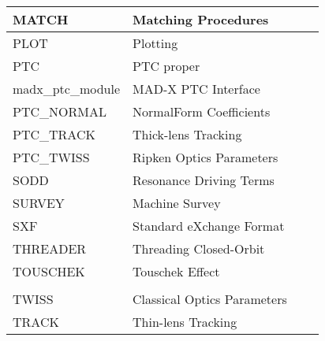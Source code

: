 \begin{table}[H]
\begin{tabular}{l|l|l|l}
MATCH              &Matching Procedures         &{\color{green}{O.~Br\"uning}}                   & {\color{red}{Oliver.Bruning@cern.ch}}      \\\hline
PLOT               &Plotting                    &{\color{green}{R.~de~Maria}}                    & {\color{red}{Riccardo.de.Maria@cern.ch}}   \\\hline
PTC                &PTC proper                  &{\color{red}{E.~Forest}} {\color{blue}{KEK}}    & {\color{red}{eforest\_4816968@hotmail.com}}\\\hline
madx\_ptc\_module    &MAD-X PTC Interface         &{\color{green}{F.~Schmidt}}                      & {\color{red}{Frank.Schmidt@cern.ch}}       \\\hline
PTC\_NORMAL        &NormalForm Coefficients     &{\color{green}{tba}}                            & {\color{red}{}}                  	      \\\hline
PTC\_TRACK         &Thick-lens Tracking         &{\color{red}{V.~Kapin}}{\color{blue}{ITEP (RU)}}& {\color{red}{Valery.Kapin@cern.ch}}        \\\hline
PTC\_TWISS         &Ripken Optics Parameters    &{\color{green}{tba}}                            & {\color{red}{}}                            \\\hline
SODD               &Resonance Driving Terms     &{\color{green}{F.~Schmidt}}                     & {\color{red}{Frank.Schmidt@cern.ch}}       \\\hline
SURVEY             &Machine Survey              &{\color{green}{F.~Tecker}}                      & {\color{red}{Frank.Tecker@cern.ch}}        \\\hline
SXF                &Standard eXchange Format    &{\color{red}{N.~Malitsky}} {\color{blue}{BNL}}  & {\color{red}{malitsky@bnl.gov}}            \\\hline
THREADER           &Threading Closed-Orbit      &{\color{green}{T.~Risselada}}                   & {\color{red}{Thys.Risselada@cern.ch}}      \\\hline
TOUSCHEK           &Touschek Effect             &{\color{red}{C.~Milardi}\color{blue}{IFNL/LNF}} & {\color{red}{catia.milardi@lnf.infn.it}}   \\
                   &                            &{\color{green}{F.~Zimmermann}}                  & {\color{red}{Frank.Zimmermann@cern.ch} }   \\\hline
TWISS              &Classical Optics Parameters &{\color{green}{F.~Schmidt}}                     & {\color{red}{Frank.Schmidt@cern.ch}}       \\\hline
TRACK              &Thin-lens Tracking          &{\color{green}{A.~Koschik}}                     & {\color{red}{Alexander.Koschik@cern.ch}}   \\\hline
\end{tabular}
\label{Module_Keepers}

\end{table}

